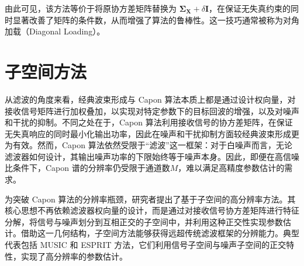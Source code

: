 由此可见，该方法等价于将原协方差矩阵替换为 \(\mathbf{\Sigma}_{\mathbf{X}} + \delta \mathbf{I}\)，在保证无失真约束的同时显著改善了矩阵的条件数，从而增强了算法的鲁棒性。这一技巧通常被称为对角加载（Diagonal Loading）。

\section{子空间方法}
从滤波的角度来看，经典波束形成与 Capon 算法本质上都是通过设计权向量，对接收信号矩阵进行加权叠加，以实现对特定参数下的目标回波的增强，以及对噪声和干扰的抑制。不同之处在于，Capon 算法利用接收信号的协方差矩阵，在保证无失真响应的同时最小化输出功率，因此在噪声和干扰抑制方面较经典波束形成更为有效。然而，Capon 算法依然受限于“滤波”这一框架：对于白噪声而言，无论滤波器如何设计，其输出噪声功率的下限始终等于噪声本身。因此，即便在高信噪比条件下，Capon 谱的分辨率仍受限于通道数\( M \)，难以满足高精度参数估计的需求。

为突破 Capon 算法的分辨率瓶颈，研究者提出了基于子空间的高分辨率方法。其核心思想不再依赖滤波器权向量的设计，而是通过对接收信号协方差矩阵进行特征分解，将信号与噪声划分到互相正交的子空间中，并利用这种正交性实现参数估计。借助这一几何结构，子空间方法能够获得远超传统滤波框架的分辨能力。典型代表包括 MUSIC 和 ESPRIT 方法，它们利用信号子空间与噪声子空间的正交特性，实现了高分辨率的参数估计。

